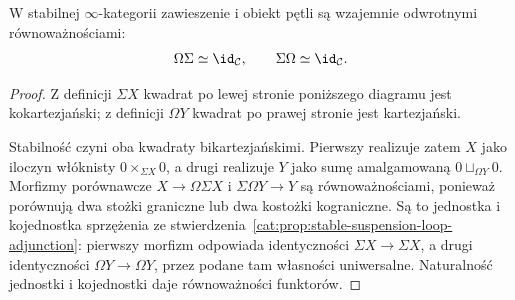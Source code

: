 \begin{twierdzenie}\label{cat:thm:stable-suspension-equivalence}
W stabilnej $\infty$-kategorii zawieszenie i obiekt pętli są wzajemnie odwrotnymi równoważnościami:
\[
 \Omega\Sigma\simeq\id_{\mathcal C},\qquad
 \Sigma\Omega\simeq\id_{\mathcal C}.
\]
\end{twierdzenie}
\begin{proof}
Z definicji $\Sigma X$ kwadrat po lewej stronie poniższego diagramu jest kokartezjański; z definicji $\Omega Y$ kwadrat po prawej stronie jest kartezjański.
\begin{center}
\end{center}
Stabilność czyni oba kwadraty bikartezjańskimi. Pierwszy realizuje zatem $X$ jako iloczyn włóknisty $0\times_{\Sigma X}0$, a drugi realizuje $Y$ jako sumę amalgamowaną $0\sqcup_{\Omega Y}0$. Morfizmy porównawcze $X\to\Omega\Sigma X$ i $\Sigma\Omega Y\to Y$ są równoważnościami, ponieważ porównują dwa stożki graniczne lub dwa kostożki kograniczne. Są to jednostka i kojednostka sprzężenia ze stwierdzenia~\ref{cat:prop:stable-suspension-loop-adjunction}: pierwszy morfizm odpowiada identyczności $\Sigma X\to\Sigma X$, a drugi identyczności $\Omega Y\to\Omega Y$, przez podane tam własności uniwersalne. Naturalność jednostki i kojednostki daje równoważności funktorów.
\end{proof}


